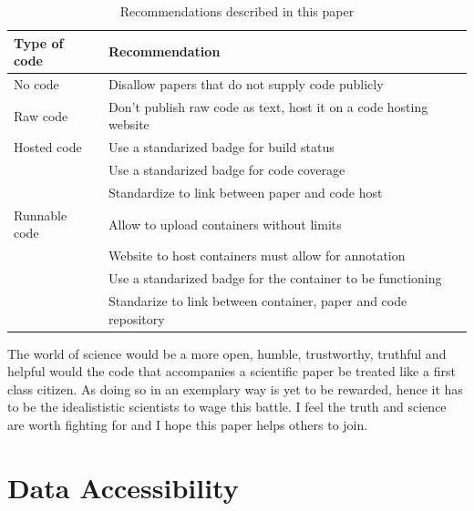 \begin{table}[h]
  \begin{tabular}{|p{2cm}|l|}
    \hline
    \textbf{Type of code} & \textbf{Recommendation} \\
    \hline
    No code       & Disallow papers that do not supply code publicly \\
    \hline
    Raw code      & Don't publish raw code as text, host it on a code hosting website \\
    \hline
    Hosted code   & Use a standarized badge for build status \\
                  & Use a standarized badge for code coverage \\
                  & Standardize to link between paper and code host \\
    \hline
    Runnable code & Allow to upload containers without limits \\
                  & Website to host containers must allow for annotation \\
                  & Use a standarized badge for the container to be functioning  \\
                  & Standarize to link between container, paper and code repository \\
    \hline
  \end{tabular}
  \caption{Recommendations described in this paper}
  \label{tab:recommendations}
\end{table}


The world of science would be a more open, humble, trustworthy, truthful
and helpful would the code that accompanies a scientific paper
be treated like a first class citizen. As doing so in an exemplary way
is yet to be rewarded, hence it has to be the idealististic scientists
to wage this battle. I feel the truth and science are worth fighting for
and I hope this paper helps others to join.

\section{Data Accessibility}

